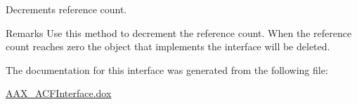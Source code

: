 Decrements reference count. 

\begin{DoxyRemark}{Remarks}
Use this method to decrement the reference count. When the reference count reaches zero the object that implements the interface will be deleted. 
\end{DoxyRemark}


The documentation for this interface was generated from the following file\+:\begin{DoxyCompactItemize}
\item 
\hyperlink{a00150}{A\+A\+X\+\_\+\+A\+C\+F\+Interface.\+dox}\end{DoxyCompactItemize}
